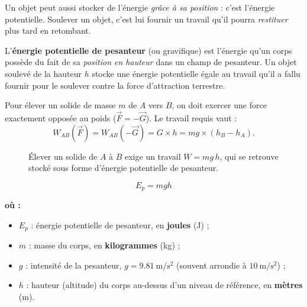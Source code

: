 \documentclass[11pt,a4paper]{article}
\newenvironment{ou}{%
  \par\smallskip\noindent\textbf{où :}\nopagebreak
  \begin{itemize}[leftmargin=1.8em,topsep=2pt,itemsep=1.5pt,parsep=0pt]}%
  {\end{itemize}}
\newcommand{\vv}[1]{\vec{#1}}
\begin{document}
Un objet peut aussi stocker de l'énergie \emph{grâce à sa position} : c'est l'énergie potentielle.
Soulever un objet, c'est lui fournir un travail qu'il pourra \emph{restituer} plus tard en
retombant.

\begin{definition}
L'\textbf{énergie potentielle de pesanteur} (ou gravifique) est l'énergie qu'un corps possède du
fait de sa \emph{position en hauteur} dans un champ de pesanteur. Un objet soulevé de la hauteur $h$
stocke une énergie potentielle égale au travail qu'il a fallu fournir pour le soulever contre la
force d'attraction terrestre.
\end{definition}

Pour élever un solide de masse $m$ de $A$ vers $B$, on doit exercer une force exactement opposée au
poids ($\vv F=-\vv G$). Le travail requis vaut :
\[
W_{AB}(\vv F)=W_{AB}(-\vv G)=G\times h=mg\times(h_B-h_A).
\]

\begin{figure}[h]
\centering
{}
\caption{Élever un solide de $A$ à $B$ exige un travail $W=mg\,h$, qui se retrouve stocké sous forme
d'énergie potentielle de pesanteur.}
\label{fig:ep}
\end{figure}

\begin{formule}
\[
\boxed{\;E_p=mgh\;}
\]
\begin{ou}
  \item $E_p$ : énergie potentielle de pesanteur, en \textbf{joules} (\si{\joule}) ;
  \item $m$ : masse du corps, en \textbf{kilogrammes} (\si{\kilogram}) ;
  \item $g$ : intensité de la pesanteur, $g=\SI{9,81}{\metre\per\second\squared}$ (souvent arrondie
        à $\SI{10}{\metre\per\second\squared}$) ;
  \item $h$ : hauteur (altitude) du corps au-dessus d'un niveau de référence, en \textbf{mètres} (\si{\metre}).
\end{ou}
\end{formule}
\end{document}
